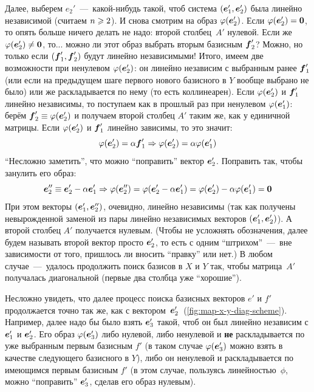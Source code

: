 \documentclass[a4paper,12pt]{article}
\begin{document}
  Далее, выберем $e_2'$~---~какой-нибудь такой, чтоб система $(\boldsymbol e_1', \boldsymbol e_2')$ была линейно независимой (считаем $n \hm\geq 2$).
  И снова смотрим на образ $\varphi(\boldsymbol e_2')$.
  Если $\phi(\bds e_2') \hm= \bds 0$, то опять больше ничего делать не надо: второй столбец~$A'$ нулевой.
  Если же $\phi(\bds e_2') \hm{\not=} \bds 0$, то... можно ли этот образ выбрать вторым базисным $\boldsymbol f_2'$?
  Можно, но только если $(\boldsymbol f_1', \boldsymbol f_2')$ будут линейно независимыми!
  Итого, имеем две возможности при ненулевом $\varphi(\boldsymbol e_2')$: он линейно независим с выбранным ранее $\boldsymbol f_1'$ (или если на предыдущем шаге первого нового базисного в $Y$ вообще выбрано не было) или же раскладывается по нему (то есть коллинеарен).
  Если $\varphi(\boldsymbol e_2')$ и $\boldsymbol f_1'$ линейно независимы, то поступаем как в прошлый раз при ненулевом $\varphi(\boldsymbol e_1')$: берём $\bds f_2' \hm\equiv \phi(\bds e_2')$ и получаем второй столбец $A'$ таким же, как у единичной матрицы.
  Если $\varphi(\boldsymbol e_2')$ и $\boldsymbol f_1'$ линейно зависимы, то это значит:
  \[
    \varphi(\boldsymbol e_2') = \alpha \boldsymbol f_1' \Rightarrow \varphi(\boldsymbol e_2') = \alpha \varphi(\boldsymbol e_1')
  \]
  ``Несложно заметить'', что можно ``поправить'' вектор $\boldsymbol e_2'$.
  Поправить так, чтобы занулить его образ:
  \[
    \boldsymbol e_2'' \equiv \boldsymbol e_2' - \alpha \boldsymbol e_1'
    \Rightarrow \varphi(\boldsymbol e_2'') = \varphi(\boldsymbol e_2' - \alpha \boldsymbol e_1') = \varphi(\boldsymbol e_2') - \alpha \varphi(\boldsymbol e_1') = \boldsymbol 0
  \]
  При этом векторы $(\boldsymbol e_1', \boldsymbol e_2'')$, очевидно, линейно независимы (так как получены невырожденной заменой из пары линейно независимых векторов $(\boldsymbol e_1', \boldsymbol e_2')$).
  А второй столбец $A'$ получается нулевым.
  (Чтобы не усложнять обозначения, далее будем называть второй вектор просто $\boldsymbol e_2'$, то есть с одним ``штрихом''~---~вне зависимости от того, пришлось ли вносить ``правку'' или нет.)
  В любом случае~---~удалось продолжить поиск базисов в $X$ и $Y$ так, чтобы матрица~$A'$ получалась диагональной (первые два столбца уже ``хорошие'').
  
  Несложно увидеть, что далее процесс поиска базисных векторов $e'$ и $f'$ продолжается точно так же, как с вектором~$\boldsymbol e_2'$~(\ref{fig:map-x-y-diag-scheme}).
  Например, далее надо бы было взять $\boldsymbol e_3'$ такой, чтоб он был линейно независим с $\boldsymbol e_1'$ и $\boldsymbol e_2'$.
  Его образ $\varphi(\boldsymbol e_3')$ либо нулевой, либо ненулевой и \textbf{не} раскладывается по уже выбранным первым базисным $f'$ (в таком случае $\varphi(\boldsymbol e_3')$ можно взять в качестве следующего базисного в $Y$), либо он ненулевой и раскладывается по имеющимся первым базисным $f'$ (в этом случае, пользуясь линейностью~$\phi$, можно ``поправить'' $\boldsymbol e_3'$, сделав его образ нулевым).
  
\end{document}
